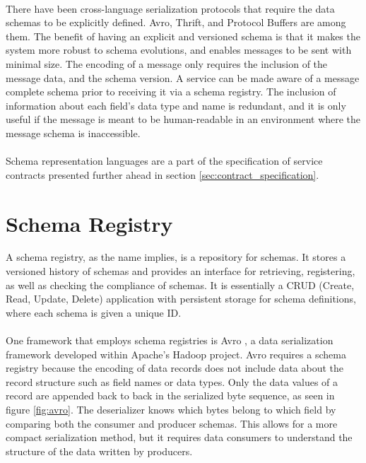 \paragraph{}

There have been cross-language serialization protocols that require the data schemas to be explicitly defined.
Avro, Thrift, and Protocol Buffers \cite{8,9,10} are among them.
The benefit of having an explicit and versioned schema is that it makes the system more robust to schema evolutions, and
enables messages to be sent with minimal size.
The encoding of a message only requires the inclusion of the message data, and the schema version.
A service can be made aware of a message complete schema prior to receiving it via a schema registry.
The inclusion of information about each field's data type and name is redundant,
and it is only useful if the message is meant to be human-readable in an environment where the message schema is inaccessible.

\paragraph{}

Schema representation languages are a part of the specification of service contracts
presented further ahead in section \ref{sec:contract_specification}.

\section{Schema Registry} %
\label{sec:schema_registry}

A schema registry, as the name implies, is a repository for schemas.
It stores a versioned history of schemas and provides an interface for retrieving, registering, as well as checking the compliance of schemas.
It is essentially a CRUD (Create, Read, Update, Delete) application with persistent storage for schema definitions, where each schema is given a unique ID.

\paragraph{}

One framework that employs schema registries is Avro \cite{8}, a data serialization framework developed within Apache's Hadoop project.
Avro requires a schema registry because the encoding of data records does not include data about the record structure such as field names or data types.
Only the data values of a record are appended back to back in the serialized byte sequence, as seen in figure \ref{fig:avro}.
The deserializer knows which bytes belong to which field by comparing both the consumer and producer schemas.
This allows for a more compact serialization method, but it requires data consumers to understand the structure of the data written by producers.

